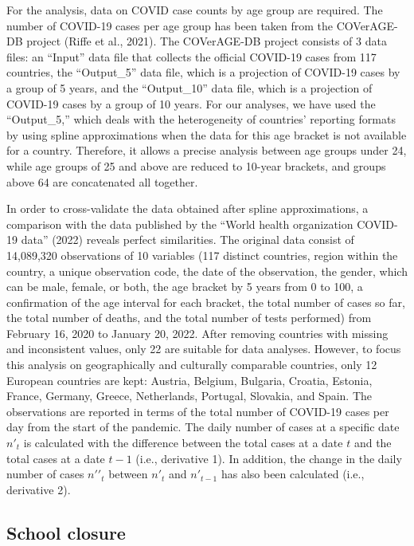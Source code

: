 \documentclass[unnumsec,webpdf,contemporary,large]{oup-authoring-template}%
\theoremstyle{thmstyleone}%
\theoremstyle{thmstyletwo}%
\theoremstyle{thmstylethree}%
\begin{document}
For the analysis, data on COVID case counts by age group are required. The number of COVID-19 cases per age group has been taken from the COVerAGE-DB project (Riffe et al., 2021). The COVerAGE-DB project consists of 3 data files: an ``Input'' data file that collects the official COVID-19 cases from 117 countries, the ``Output\_5'' data file, which is a projection of COVID-19 cases by a group of 5 years, and the ``Output\_10'' data file, which is a projection of COVID-19 cases by a group of 10 years. For our analyses, we have used the ``Output\_5,'' which deals with the heterogeneity of countries' reporting formats by using spline approximations when the data for this age bracket is not available for a country. Therefore, it allows a precise analysis between age groups under 24, while age groups of 25 and above are reduced to 10-year brackets, and groups above 64 are concatenated all together.

In order to cross-validate the data obtained after spline approximations, a comparison with the data published by the {``World health organization COVID-19 data''} (2022) reveals perfect similarities. The original data consist of 14,089,320 observations of 10 variables (117 distinct countries, region within the country, a unique observation code, the date of the observation, the gender, which can be male, female, or both, the age bracket by 5 years from 0 to 100, a confirmation of the age interval for each bracket, the total number of cases so far, the total number of deaths, and the total number of tests performed) from February 16, 2020 to January 20, 2022. After removing countries with missing and inconsistent values, only 22 are suitable for data analyses. However, to focus this analysis on geographically and culturally comparable countries, only 12 European countries are kept: Austria, Belgium, Bulgaria, Croatia, Estonia, France, Germany, Greece, Netherlands, Portugal, Slovakia, and Spain. The observations are reported in terms of the total number of COVID-19 cases per day from the start of the pandemic. The daily number of cases at a specific date \(n\prime_{t}\) is calculated with the difference between the total cases at a date \(t\) and the total cases at a date \(t-1\) (i.e., derivative 1). In addition, the change in the daily number of cases \(n\prime\prime_{t}\) between \(n\prime_{t}\) and \(n\prime_{t-1}\) has also been calculated (i.e., derivative 2).

\hypertarget{school-closure}{%
\subsection{School closure}\label{school-closure}}
\end{document}
